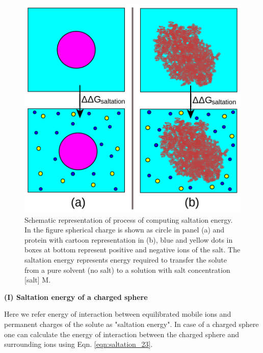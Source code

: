 \documentclass[9pt,tutorial]{livecoms}
\begin{document}
\begin{figure}[hbt!]
\includegraphics[width=\linewidth]{Figure_6.png}
\caption{Schematic representation of process of computing saltation energy. In the figure spherical charge is shown as circle in panel (a) and protein with cartoon representation in (b), blue and yellow dots in boxes at bottom represent positive and negative ions of the salt. The saltation energy represents energy required to transfer the solute from a pure solvent (no salt) to a solution with salt concentration [salt] M.}
\label{fig:scheme_saltation}
\end{figure}


\textbf{(I) Saltation energy of a charged sphere}

Here we refer energy of interaction between equilibrated mobile ions and permanent charges of the solute as "saltation energy". In case of a charged sphere one can calculate the energy of interaction between the charged sphere and surrounding ions using Eqn. \ref{eqn:saltation_23}.
\end{document}
